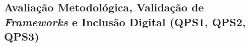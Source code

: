 \documentclass[12pt]{article}
\begin{document}

\subsection{Avaliação Metodológica, Validação de \textit{Frameworks} e Inclusão Digital (QPS1, QPS2, QPS3)}
\end{document}
